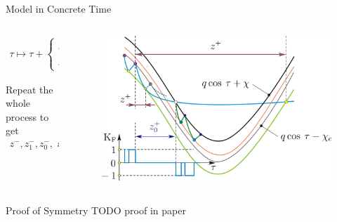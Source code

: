 \begin{frame}{Model in Concrete Time}
	\vspace{-1em}
	\begin{columns}
		\begin{column}{.5 \textwidth}
			\begin{align*}
				\tau \mapsto  \tau + \begin{cases}
					                     z^{+} + z_{1}^{+}     & \text{if } z^{+} \leq z_{0}^{+} \\
					                     z_{0}^{+} + z_{2}^{+} & \text{if } z^{+} > z_{0}^{+}
				                     \end{cases}
			\end{align*}
			\vspace{1em}

			Repeat the whole process to get
			\begin{align*}
				z^{-}, z_{1}^{-}, z_{0}^{-}, \text{ and } z_{2}^{-}
			\end{align*}
		\end{column}
		\begin{column}{.5 \textwidth}
			\begin{figure}
				\includegraphics[width=1 \textwidth]{Figs/discrete_model_derivation_cases.png}
			\end{figure}
		\end{column}
	\end{columns}

	\flushright{[Avrutin]}
\end{frame}

\begin{frame}{Proof of Symmetry}
	TODO proof in paper

	\flushright{[Zhusubaliyev]}
\end{frame}

